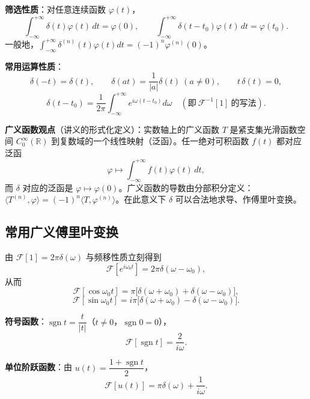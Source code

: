 \textbf{筛选性质}：对任意连续函数 \(\varphi(t)\)，
\[
\int_{-\infty}^{+\infty}\delta(t)\varphi(t)\,dt=\varphi(0),
\qquad
\int_{-\infty}^{+\infty}\delta(t-t_0)\varphi(t)\,dt=\varphi(t_0).
\]
一般地，\(\displaystyle\int_{-\infty}^{+\infty}\delta^{(n)}(t)\varphi(t)dt=(-1)^n\varphi^{(n)}(0)\)。

\textbf{常用运算性质}：
\[
\delta(-t)=\delta(t),\qquad
\delta(at)=\frac{1}{|a|}\delta(t)\ (a\neq0),\qquad
t\,\delta(t)=0,
\]
\[
\delta(t-t_0)=\frac{1}{2\pi}\int_{-\infty}^{+\infty}e^{i\omega(t-t_0)}d\omega
\quad(\text{即}\ \mathscr{F}^{-1}[1]\ \text{的写法}).
\]

\textbf{广义函数观点}（讲义的形式化定义）：实数轴上的广义函数 \(T\) 是紧支集光滑函数空间 \(C_0^\infty(\mathbb{R})\) 到复数域的一个线性映射（泛函）。任一绝对可积函数 \(f(t)\) 都对应泛函
\[
\varphi\mapsto\int_{-\infty}^{+\infty}f(t)\varphi(t)\,dt,
\]
而 \(\delta\) 对应的泛函是 \(\varphi\mapsto\varphi(0)\)。广义函数的导数由分部积分定义：\(\langle T^{(n)},\varphi\rangle=(-1)^n\langle T,\varphi^{(n)}\rangle\)。在此意义下 \(\delta\) 可以合法地求导、作傅里叶变换。

\subsection{常用广义傅里叶变换}


由 \(\mathscr{F}[1]=2\pi\delta(\omega)\) 与频移性质立刻得到
\[
\mathscr{F}\left[e^{i\omega_0t}\right]=2\pi\delta(\omega-\omega_0),
\]
从而
\[
\mathscr{F}[\cos\omega_0t]=\pi\big[\delta(\omega+\omega_0)+\delta(\omega-\omega_0)\big],
\]
\[
\mathscr{F}[\sin\omega_0t]=i\pi\big[\delta(\omega+\omega_0)-\delta(\omega-\omega_0)\big].
\]

\textbf{符号函数}：\(\operatorname{sgn}t=\dfrac{t}{|t|}\)（\(t\neq0\)，\(\operatorname{sgn}0=0\)），
\[
\mathscr{F}[\operatorname{sgn}t]=\frac{2}{i\omega}.
\]

\textbf{单位阶跃函数}：由 \(u(t)=\dfrac{1+\operatorname{sgn}t}{2}\)，
\[
\mathscr{F}[u(t)]=\pi\delta(\omega)+\frac{1}{i\omega}.
\]


